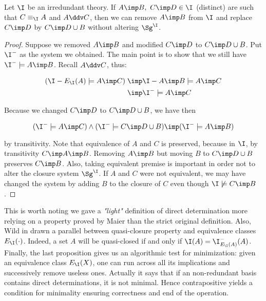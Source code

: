 \begin{proposition} Let $\I$ be an irredundant theory. If $A \imp B, \ C \imp D 
\in \I$ (distinct) are such that $C \equiv_{\I} A$ and $A \ddv C$, then we can remove $A \imp B$ from $\I$ and replace $C \imp D$ by $C \imp D \cup B$ without 
altering $\Sg^{\I}$.
\end{proposition}

\begin{proof} Suppose we removed $A \imp B$ and modified $C \imp D$ to $C \imp D \cup B$. Put $\I^{-}$ as the system we obtained. The main point is to show that we still have $\I^{-} \models A \imp B$. Recall $A \ddv C$, thus:

\begin{align*}
	(\I - E_{\I}(A) \models A \imp C) & \; \imp \I - A \imp B \models A \imp 
	C \\
	& \; \imp \I^{-} \models A \imp C \\ 
\end{align*}

\noindent Because we changed $C \imp D$ to $C \imp D \cup B$, we have then

\[ (\I^{-} \models A \imp C) \land (\I^{-} \models C \imp D \cup B) \imp
	(\I^{-} \models A \imp B) \]

\noindent by transitivity. Note that equivalence of $A$ and $C$ is 
preserved, because in $\I$, by transitivity $C \imp A \imp B$. Removing $A \imp 
B$ but moving $B$ to $C \imp D \cup B$ preserves $C \imp B$. Also, taking 
equivalent premise is important in order not to alter the closure system 
$\Sg^{\I}$. If $A$ and $C$ were not equivalent, we may have changed the system 
by adding $B$ to the closure of $C$ even though $\I \not\models C \imp B$.
\end{proof}

\vspace{1.2em}

This is worth noting we gave a \textit{"light"} definition of direct determination more relying on a property proved by Maier than the strict original definition. Also, Wild in \cite{wild_implicational_1989, wild_theory_1994} drawn a parallel between quasi-closure property and equivalence classes $E_{\I}(\cdot)$. Indeed, a set $A$ will be quasi-closed if and only if $\I(A) = \I^{-}_{E_{\I}(A)}(A)$. Finally, the last proposition gives us an algorithmic test for minimization: given an equivalence class $E_{\I}(X)$, one can run across all its implications and successively remove useless ones. Actually it says that if an non-redundant basis contains direct determinations, it is not minimal. Hence contrapositive yields a condition for minimality ensuring correctness and end of the operation.

